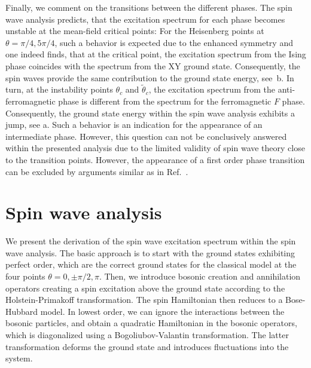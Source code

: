 Finally, we comment on the transitions between the different phases. The spin wave analysis predicts,
that the excitation spectrum for each phase becomes unstable at the mean-field critical points: For the Heisenberg
points at $\theta = \pi/4, 5\pi/4$, such a behavior is expected due to the enhanced symmetry and one indeed finds,
that at the critical point, the excitation spectrum from the Ising phase coincides with the spectrum from the XY ground state.
Consequently, the spin waves provide the same contribution to the ground state energy, see~b. In turn, at the instability points
$\theta_{c}$ and $\tilde{\theta}_{c}$, the excitation spectrum from the anti-ferromagnetic phase is different from the spectrum for the ferromagnetic $F$ phase.
Consequently, the ground state energy within the spin wave analysis exhibits a jump, see a. Such a behavior is an indication
for the appearance of an intermediate phase. However, this question can not be conclusively answered within the presented analysis due to the limited validity of spin wave theory close to the transition points. However, the appearance of a first order phase transition can be excluded by arguments similar as in
Ref.~\cite{Spivak2004}.

\section{Spin wave analysis}
We present the derivation of the spin wave excitation spectrum
within the spin wave analysis. The basic approach is to start with the ground
states exhibiting perfect order, which are the correct ground states for the classical
model at the four points $\theta = 0,\pm \pi/2, \pi$.  Then, we introduce bosonic
creation and annihilation operators creating a spin excitation above the ground
state according to the Holstein-Primakoff transformation. The spin Hamiltonian
then reduces to a Bose-Hubbard model. In lowest order, we can ignore the
interactions between the bosonic particles, and obtain a quadratic Hamiltonian
in the bosonic operators, which is diagonalized using a
Bogoliubov-Valantin transformation.  The latter transformation deforms the
ground state and introduces fluctuations into the system.

